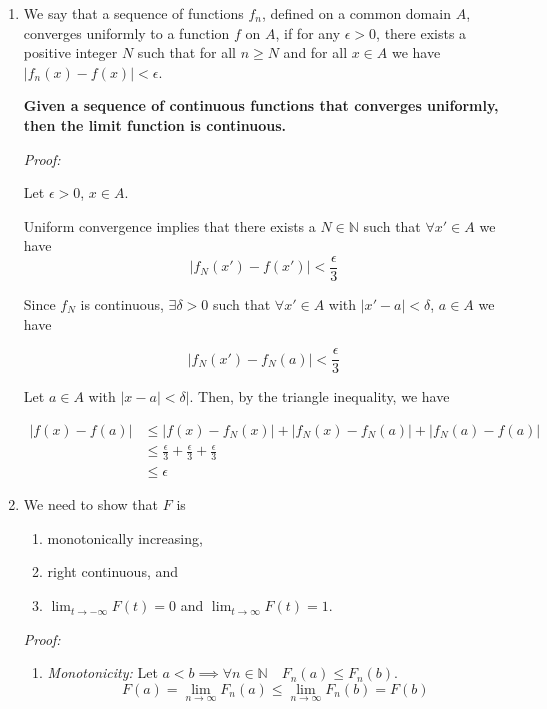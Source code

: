 \documentclass[12pt]{article}
\begin{document}
\begin{enumerate}
    \item We say that a sequence of functions ${f_n}$, defined on a common domain $A$, converges uniformly to a function $f$ on $A$, if for any $\epsilon > 0$, there exists a positive integer $N$ such that for all $n  \geq N$ and for all $x \in A$ we have $|f_n(x) - f(x)| < \epsilon$.

    \textbf{Given a sequence of continuous functions that converges uniformly,
    then the limit function is continuous.}

    \textit{Proof:}

    Let $\epsilon > 0$, $x \in A$.

    Uniform convergence implies that there exists a $N \in \mathbb{N}$ such that  $\forall x' \in A$ we have 
    \[
    |f_N(x') - f(x')| < \frac{\epsilon}{3}
    \]

    Since $f_N$ is continuous, $\exists \delta > 0$ such that  $\forall x' \in A$ with $|x'-a| < \delta$, $a \in A$ we have

    \[
    |f_N(x') - f_N(a)| < \frac{\epsilon}{3}
    \]

 Let $a \in A$ with $|x-a|<\delta|$. Then, by the triangle inequality, we have

    \begin{align*}
        |f(x)-f(a)| &\leq |f(x)-f_N(x)|+|f_N(x)-f_N(a)|+|f_N(a)-f(a)|\\
        &\leq \frac{\epsilon}{3}+\frac{\epsilon}{3}+\frac{\epsilon}{3}\\
        &\leq \epsilon
    \end{align*}


    \item We need to show that \( F \) is 
    \begin{enumerate}
        \item monotonically increasing,
        \item right continuous, and
        \item  \( \lim_{t\rightarrow -\infty} F(t) = 0 \) and \( \lim_{t\rightarrow \infty} F(t) = 1 \).
    \end{enumerate}
    \textit{Proof:}
    \begin{enumerate}
         
    
        \item \textit{Monotonicity:} 
        Let $a<b \implies \forall n \in \mathbb{N} \quad F_n(a) \leq F_n(b)$. 
        \[
        F(a)=\lim_{n \to \infty} F_n(a) \leq \lim_{n \to \infty} F_n(b)=F(b)    
        \]



\end{enumerate}
\end{enumerate}
\end{document}
